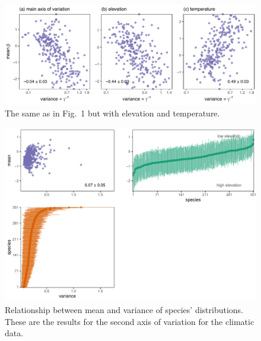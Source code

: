 \documentclass[11pt, a4paper]{article}
\begin{document}
\clearpage

\begin{figure}[ht]
  \centering
    \vspace{0.5cm}
    \includegraphics[width=1\textwidth]{figures/pca-elevation-temperature}
    	  \vspace{0.3cm}
	   \caption{The same as in Fig.~1 but with elevation and temperature.}
      \label{sfig:temperature-elevation}
\end{figure}

\clearpage

\begin{figure}[h]
  \centering
    \vspace{0.5cm}
    \includegraphics[width=1\textwidth]{figures/figure1-secondaxis}
    	  \vspace{0.3cm}
	   \caption{Relationship between mean and variance of species' distributions. These are the results for the second axis of variation for the climatic data.}
      \label{sfig:sensitivity}
\end{figure}
\end{document}
